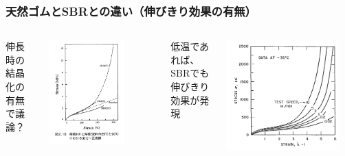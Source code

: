 \documentclass[11pt, dvipdfmx]{beamer}
\begin{document}
\begin{frame}
\frametitle{天然ゴムとSBRとの違い（伸びきり効果の有無）}

\begin{columns}[totalwidth=1\textwidth]

伸長時の結晶化の有無で議論？

\includegraphics[width=0.7\textwidth]{./fig/NR_SBR.png}


低温であれば、SBRでも伸びきり効果が発現

\includegraphics[width=0.9\textwidth]{./fig/SBR_lowTemp.png}


\end{columns}
\end{frame}
\end{document}
